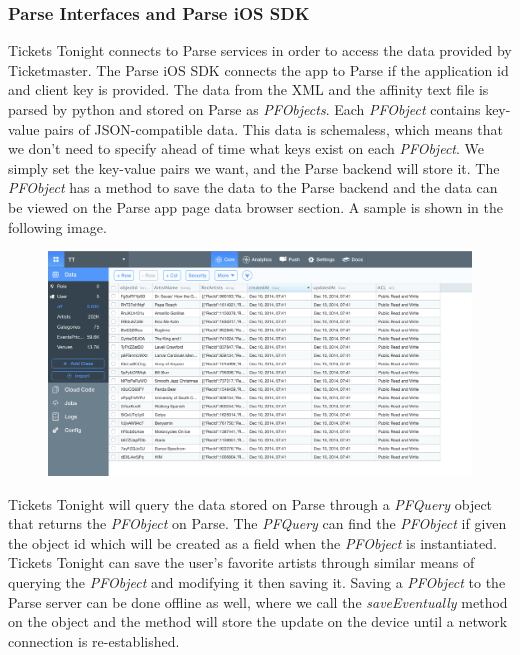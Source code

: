 	  \subsubsection{Parse Interfaces and Parse iOS SDK}
		Tickets Tonight connects to Parse services in order to access the data provided by Ticketmaster. The Parse iOS SDK connects the app to 
		Parse if the application id and client key is provided. The data from the XML and the affinity text file is parsed by python and stored on 
		Parse as \textit{PFObjects}.  Each \textit{PFObject} contains key-value pairs of JSON-compatible data. This data is schemaless, which means that we 
		don't need to specify ahead of time what keys exist on each \textit{PFObject}. We simply set the key-value pairs we want, and the Parse backend 
		will store it. The \textit{PFObject} has a method to save the data to the Parse backend and the data can be viewed on the Parse app page data 
		browser section. A sample is shown in the following image. 
		\begin{figure}
		\centering
		\begin{minipage}{1.\textwidth}
			\centering
			\includegraphics[width=.7\linewidth]{./pics/parse_data_schema.png}
		\end{minipage}%
	    \end{figure}
	    Tickets Tonight will query the data stored on Parse through a \textit{PFQuery} object that returns the \textit{PFObject} on Parse. 
	    The \textit{PFQuery} can find the \textit{PFObject} if given the object id which will be created as a field when the \textit{PFObject} is instantiated. 
	    Tickets Tonight can save the user’s favorite artists through similar means of querying the \textit{PFObject} and modifying it then saving it. 
	    Saving a \textit{PFObject} to the Parse server can be done offline as well, where we call the \textit{saveEventually} method on the object and the method 
	    will store the update on the device until a network connection is re-established. 
	    
